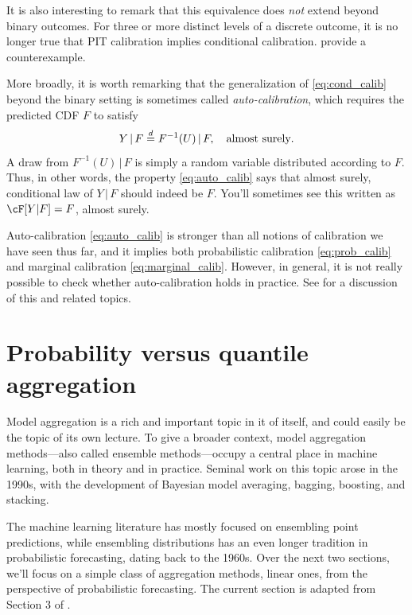 \documentclass{article}
\begin{document}
It is also interesting to remark that this equivalence does \emph{not} extend
beyond binary outcomes. For three or more distinct levels of a discrete outcome,
it is no longer true that PIT calibration implies conditional
calibration. \citet{gneiting2022regression} provide a counterexample.  

More broadly, it is worth remarking that the generalization of
\eqref{eq:cond_calib} beyond the binary setting is sometimes called
\emph{auto-calibration}, which requires the predicted CDF $F$ to satisfy  
\begin{equation}  
\label{eq:auto_calib}
Y \,|\, F \overset{d}{=} F^{-1}(U) \,|\, F, \quad \text{almost surely}.   
\end{equation}
A draw from $F^{-1}(U) \,|\, F$ is simply a random variable distributed
according to $F$. Thus, in other words, the property \eqref{eq:auto_calib} says
that almost surely, conditional law of $Y \,|\, F$ should indeed be $F$. You'll 
sometimes see this written as $\cF[Y|F] = F$, almost surely. 

Auto-calibration \eqref{eq:auto_calib} is stronger than all notions of
calibration we have seen thus far, and it implies both probabilistic calibration
\eqref{eq:prob_calib} and marginal calibration
\eqref{eq:marginal_calib}. However, in general, it is not really possible to
check whether auto-calibration holds in practice. See
\citet{gneiting2022regression} for a discussion of this and related topics.

\section{Probability versus quantile aggregation}
\label{sec:prob_quant}

Model aggregation is a rich and important topic in it of itself, and could
easily be the topic of its own lecture. To give a broader context, model
aggregation methods---also called ensemble methods---occupy a central place in
machine learning, both in theory and in practice. Seminal work on this topic
arose in the 1990s, with the development of Bayesian model averaging, bagging,
boosting, and stacking. 

The machine learning literature has mostly focused on ensembling point
predictions, while ensembling distributions has an even longer tradition
in probabilistic forecasting, dating back to the 1960s. Over the next two
sections, we'll focus on a simple class of aggregation methods, linear ones,
from the perspective of probabilistic forecasting. The current section is
adapted from Section 3 of \citet{fakoor2021flexible}.  
\end{document}

